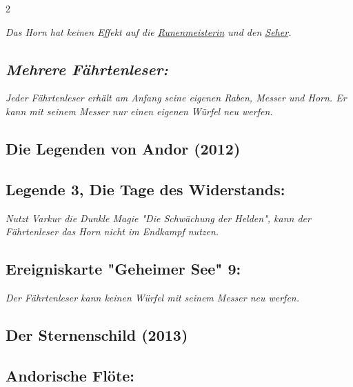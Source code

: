 \documentclass[10pt, a4paper, oneside]{book}
\newcommand{\fan}[1]{\textit{#1}}
\begin{document}
\begin{multicols*}{2}
\begin{nobgcolor}
\fan{Das Horn hat keinen Effekt auf die \hyperref[runenmeisterin]{Runenmeisterin} und den \hyperref[seher]{Seher}.}







\subsection{\fan{Mehrere Fährtenleser:}}

\fan{Jeder Fährtenleser erhält am Anfang seine eigenen Raben, Messer und Horn. Er kann mit seinem Messer nur einen eigenen Würfel neu werfen.}



\end{nobgcolor}


\begin{bgcolor}
\section{Die Legenden von Andor (2012)}

\subsection{Legende 3, Die Tage des Widerstands:}

\fan{Nutzt Varkur die Dunkle Magie "Die Schwächung der Helden", kann der Fährtenleser das Horn nicht im Endkampf nutzen.}



\subsection{Ereigniskarte "Geheimer See" 9:}

\fan{Der Fährtenleser kann keinen Würfel mit seinem Messer neu werfen.}





\end{bgcolor}


\begin{bgcolor}
\section{Der Sternenschild (2013)}

\subsection{Andorische Flöte:}


\end{bgcolor}
\end{multicols*}
\end{document}
